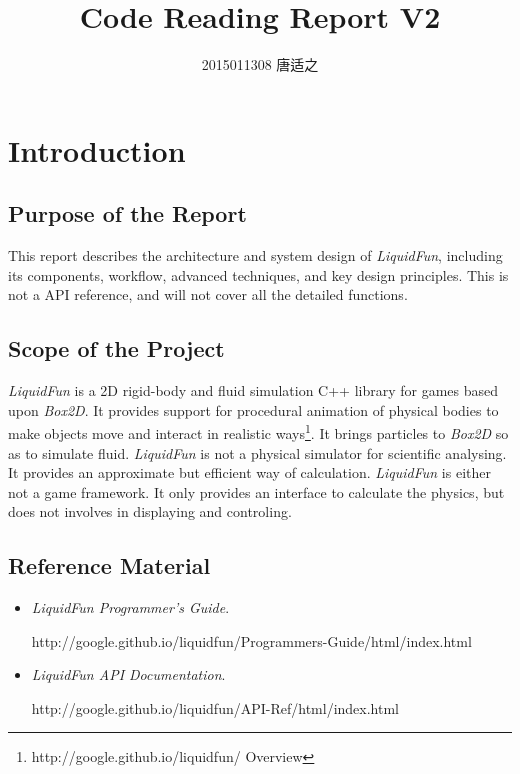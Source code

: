 \documentclass[UTF8]{ctexart}
\title{\huge Code Reading Report V2}
\author{\large 2015011308 唐适之}
\date{}
\begin{document}
    
    \maketitle

    \section{Introduction}

        \subsection{Purpose of the Report}

            This report describes the architecture and system design of \textit{LiquidFun}, including its components, workflow, advanced techniques, and key design principles. This is not a API reference, and will not cover all the detailed functions.

        \subsection{Scope of the Project}

            \textit{LiquidFun} is a 2D rigid-body and fluid simulation C++ library for games based upon \textit{Box2D}. It provides support for procedural animation of physical bodies to make objects move and interact in realistic ways\footnote{http://google.github.io/liquidfun/ Overview}. It brings particles to \textit{Box2D} so as to simulate fluid. \textit{LiquidFun} is not a physical simulator for scientific analysing. It provides an approximate but efficient way of calculation. \textit{LiquidFun} is either not a game framework. It only provides an interface to calculate the physics, but does not involves in displaying and controling.

        \subsection{Reference Material}

            \begin{itemize}
                \item \textit{LiquidFun Programmer's Guide}.

                      http://google.github.io/liquidfun/Programmers-Guide/html/index.html
                      
                \item \textit{LiquidFun API Documentation}.

                      http://google.github.io/liquidfun/API-Ref/html/index.html
            \end{itemize}
\end{document}
